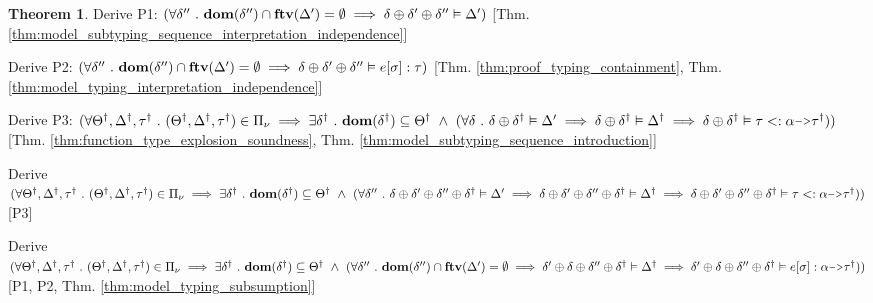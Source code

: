 \documentclass[acmsmall]{acmart}
\theoremstyle{definition}
\newtheorem{theorem}{Theorem}[section]
\begin{document}
\begin{theorem}
  \item \I\I \N Derive P1: $(
    \forall \delta'' \ .\  \textbf{dom}(\delta'') \cap \textbf{ftv}(\Delta') = \emptyset \implies \delta \oplus \delta' \oplus \delta'' \vDash \Delta'
  )$ [Thm. \ref{thm:model_subtyping_sequence_interpretation_independence}]

  \item \I\I \N Derive P2: $(
    \forall \delta'' \ .\  \textbf{dom}(\delta'') \cap \textbf{ftv}(\Delta') = \emptyset \implies \delta \oplus \delta' \oplus \delta'' \vDash e[\sigma] : \tau
  )$ [Thm. \ref{thm:proof_typing_containment},
      Thm. \ref{thm:model_typing_interpretation_independence}]

  \item \I\I \N Derive P3: $(
    \forall \Theta^\dagger, \Delta^\dagger, \tau^\dagger \qua 
    (\Theta^\dagger, \Delta^\dagger, \tau^\dagger) \in \Pi_\nu \implies
    \exists \delta^\dagger \qua \textbf{dom}(\delta^\dagger) \subseteq \Theta^\dagger \up 
    (
    \forall \delta \qua
    \delta \oplus \delta^\dagger \satisfies \Delta' \implies
    \delta \oplus \delta^\dagger \satisfies \Delta^\dagger \implies
    \delta \oplus \delta^\dagger \satisfies \tau \subtypes \alpha \J{->} \tau^\dagger
    )
  )$ [Thm. \ref{thm:function_type_explosion_soundness}, Thm. \ref{thm:model_subtyping_sequence_introduction}]

  \item \I\I \N Derive $(
    \forall \Theta^\dagger, \Delta^\dagger, \tau^\dagger \qua 
    (\Theta^\dagger, \Delta^\dagger, \tau^\dagger) \in \Pi_\nu \implies
    \exists \delta^\dagger \qua \textbf{dom}(\delta^\dagger) \subseteq \Theta^\dagger \up 
    (
    \forall \delta'' \qua
    \delta \oplus \delta' \oplus \delta'' \oplus \delta^\dagger \satisfies \Delta' \implies
    \delta \oplus \delta' \oplus \delta'' \oplus \delta^\dagger \satisfies \Delta^\dagger \implies
    \delta \oplus \delta' \oplus \delta'' \oplus \delta^\dagger \satisfies \tau \subtypes \alpha \J{->} \tau^\dagger
    )
  )$ [P3]

  \item \I\I \N Derive $(
    \forall \Theta^\dagger, \Delta^\dagger, \tau^\dagger \qua 
    (\Theta^\dagger, \Delta^\dagger, \tau^\dagger) \in \Pi_\nu \implies
    \exists \delta^\dagger \qua \textbf{dom}(\delta^\dagger) \subseteq \Theta^\dagger \up 
    (
    \forall \delta'' \qua
    \textbf{dom}(\delta'') \cap \textbf{ftv}(\Delta') = \emptyset \implies
    \delta' \oplus \delta \oplus \delta'' \oplus \delta^\dagger \satisfies \Delta^\dagger \implies
    \delta' \oplus \delta \oplus \delta'' \oplus \delta^\dagger \satisfies e[\sigma] \hastype \alpha \J{->} \tau^\dagger
    )
  )$ [P1, P2, Thm. \ref{thm:model_typing_subsumption}]


\end{theorem}
\end{document}
